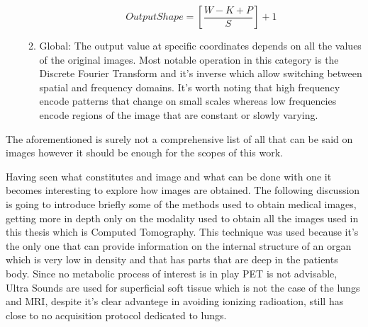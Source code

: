 \begin{enumerate}
\begin{enumerate}
\begin{equation}
Output Shape =\left[ \frac{W - K + P}{S}\right]+1
\end{equation}

		\item Global: The output value at specific coordinates depends on all the values of the original images. Most notable operation in this category is the Discrete Fourier Transform and it's inverse which allow switching between spatial and frequency domains. It's worth noting that high frequency encode patterns that change on small scales whereas low frequencies encode regions of the image that are constant or slowly varying.
		\end{enumerate}
\end{enumerate}

The aforementioned is surely not a comprehensive list of all that can be said on images however it should be enough for the scopes of this work.

\vspace{7mm} %

Having seen what constitutes and image and what can be done with one it becomes interesting to explore how images are obtained. The following discussion is going to introduce briefly some of the methods used to obtain medical images, getting more in depth only on the modality used to obtain all the images used in this thesis which is Computed Tomography.
This technique was used because it's the only one that can provide information on the internal structure of an organ which is very low in density and that has parts that are deep in the patients body. Since no metabolic process of interest is in play PET is not advisable, Ultra Sounds are used for superficial soft tissue which is not the case of the lungs and MRI, despite it's clear advantege in avoiding ionizing radioation, still has close to no acquisition protocol dedicated to lungs.

